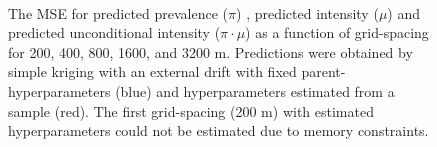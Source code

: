 \documentclass[review]{elsarticle}
\begin{document}
\begin{figure}[htbp]
\quad
{}\quad
{}\\
\caption{The MSE for predicted prevalence ($\pi$) \protect{}, predicted intensity ($\mu$) \protect{} and predicted unconditional intensity ($\pi \cdot \mu$) \protect{} as a function of grid-spacing for 200, 400, 800, 1600, and 3200 m. Predictions were obtained by simple kriging with an external drift with fixed parent-hyperparameters (blue) and hyperparameters estimated from a sample (red). The first grid-spacing (200 m) with estimated hyperparameters could not be estimated due to memory constraints.}
\label{fig:mse}
\end{figure}
\end{document}
